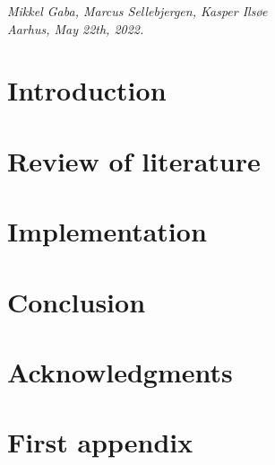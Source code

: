 \documentclass[11pt,openright]{report}
\begin{document}


\vspace{2ex}
\begin{flushright}
  \emph{Mikkel Gaba, Marcus Sellebjergen, Kasper Ils{\o}e}\\
  \emph{Aarhus, May 22th, 2022.}
\end{flushright}

\tableofcontents
\cleardoublepage
{}
\setcounter{secnumdepth}{2}


\chapter{Introduction}
\label{ch:intro}





\chapter{Review of literature}
\label{ch:main1}








\chapter{Implementation}
\label{ch:main2}








\chapter{Conclusion}
\label{ch:conclusion}



\chapter*{Acknowledgments}




\cleardoublepage
{}




\cleardoublepage
\appendix
\chapter{First appendix}
\end{document}
